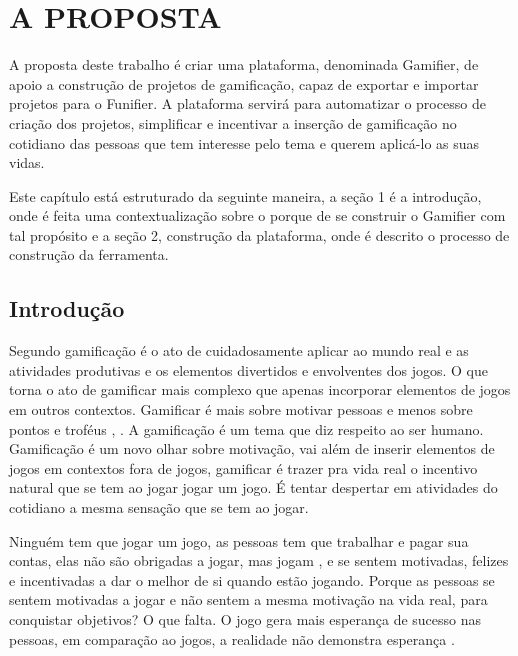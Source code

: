 
\chapter[A Proposta]{A PROPOSTA}

A proposta deste trabalho é criar uma plataforma, denominada Gamifier, de apoio a construção de projetos de gamificação, capaz de exportar e importar projetos para o Funifier. A plataforma servirá para automatizar o processo de criação dos projetos, simplificar e incentivar a inserção de gamificação no cotidiano das pessoas que tem interesse pelo tema e querem aplicá-lo as suas vidas.

 Este capítulo está estruturado da seguinte maneira, a seção 1 é a introdução, onde é feita uma contextualização sobre o porque de se construir o Gamifier com tal propósito e a seção 2, construção da plataforma, onde é descrito o processo de construção da ferramenta.           

\section{Introdução}

 

Segundo \cite{chou2015actionable} gamificação é o ato de cuidadosamente aplicar ao mundo real e as atividades produtivas e os elementos divertidos e envolventes dos jogos. O que torna o ato de gamificar mais complexo que apenas incorporar elementos de jogos em outros contextos. Gamificar é mais sobre  motivar pessoas e menos sobre pontos e troféus \cite{chou2015actionable}, \cite{zichermann2011gamification}. A gamificação é um tema que diz respeito ao ser humano. Gamificação é um novo olhar sobre motivação, vai além de inserir elementos de jogos em contextos fora de jogos, gamificar é trazer pra vida real o incentivo natural que se tem ao jogar jogar um jogo.  É tentar despertar em atividades do cotidiano a mesma sensação que se tem ao jogar.

Ninguém tem que jogar um jogo, as pessoas tem que trabalhar e pagar sua contas, elas não são obrigadas a jogar, mas jogam \cite{chou2015actionable},  \cite{mcgonigal2011reality} e se sentem motivadas, felizes e incentivadas a dar o melhor de si quando estão jogando. Porque as pessoas se sentem motivadas a jogar e não sentem a mesma motivação na vida real, para conquistar objetivos? O que falta. O jogo gera mais esperança de sucesso nas pessoas, em comparação ao jogos, a realidade não demonstra esperança \cite{mcgonigal2011reality}.

